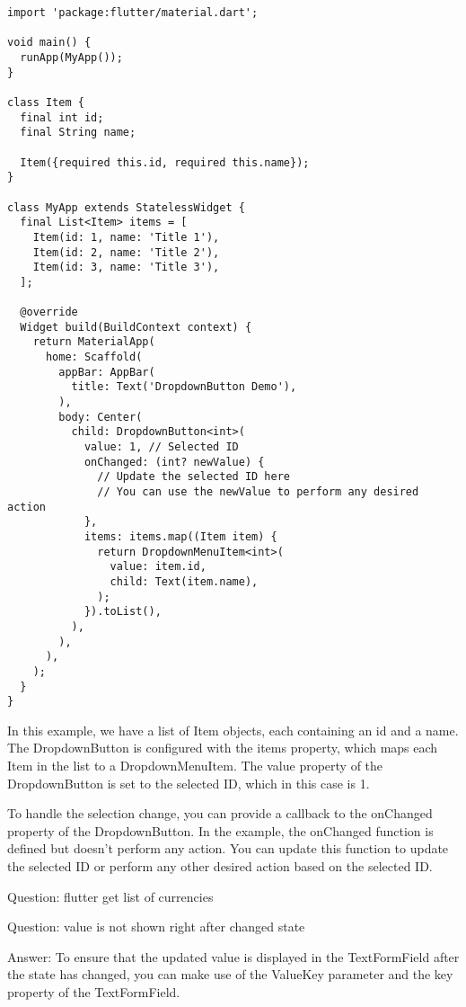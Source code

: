 \begin{lstlisting}
import 'package:flutter/material.dart';

void main() {
  runApp(MyApp());
}

class Item {
  final int id;
  final String name;

  Item({required this.id, required this.name});
}

class MyApp extends StatelessWidget {
  final List<Item> items = [
    Item(id: 1, name: 'Title 1'),
    Item(id: 2, name: 'Title 2'),
    Item(id: 3, name: 'Title 3'),
  ];

  @override
  Widget build(BuildContext context) {
    return MaterialApp(
      home: Scaffold(
        appBar: AppBar(
          title: Text('DropdownButton Demo'),
        ),
        body: Center(
          child: DropdownButton<int>(
            value: 1, // Selected ID
            onChanged: (int? newValue) {
              // Update the selected ID here
              // You can use the newValue to perform any desired action
            },
            items: items.map((Item item) {
              return DropdownMenuItem<int>(
                value: item.id,
                child: Text(item.name),
              );
            }).toList(),
          ),
        ),
      ),
    );
  }
}
\end{lstlisting}

In this example, we have a list of Item objects, each containing an id and a name. The DropdownButton is configured 
with the items property, which maps each Item in the list to a DropdownMenuItem. The value property of the 
DropdownButton is set to the selected ID, which in this case is 1.

To handle the selection change, you can provide a callback to the onChanged property of the DropdownButton. 
In the example, the onChanged function is defined but doesn't perform any action. You can update this function 
to update the selected ID or perform any other desired action based on the selected ID.

Question: flutter get list of currencies

Question: value is not shown right after changed state

Answer: To ensure that the updated value is displayed in the TextFormField after the state has changed, you can make 
use of the ValueKey parameter and the key property of the TextFormField.

